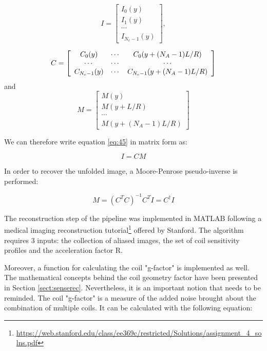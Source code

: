 \begin{equation}
    I = \left[
    \begin{array}{ c }
          I_0(y) \\
          I_1(y) \\
          \cdots \\
           I_{N_c-1}(y)
    \end{array}
    \right],
\end{equation}

\begin{equation}
    C = \left[
    \begin{array}{ c c c }
          C_0(y) & \cdots & C_0(y+(N_A-1)L/R)  \\
          \cdots & \cdots & \cdots \\
          C_{N_c-1}(y) & \cdots & C_{N_c-1}(y+(N_A-1)L/R)
    \end{array}
    \right]
\end{equation}
and
\begin{equation}
    M = \left[
    \begin{array}{ c }
          M(y) \\
          M(y+L/R) \\
          \cdots \\
          M(y+(N_A-1)L/R)
    \end{array}
    \right]
\end{equation}

We can therefore write equation \ref{eq:45} in matrix form as:

\begin{equation}
    I = C M
\end{equation} 

In order to recover the unfolded image, a Moore-Penrose pseudo-inverse is performed:

\begin{equation}
    M = (C^T C) ^{-1} C^T I =  C^\dagger I
\end{equation}

The reconstruction step of the pipeline was implemented in MATLAB following a medical imaging reconstruction tutorial\footnote{\url{https://web.stanford.edu/class/ee369c/restricted/Solutions/assignment_4_solns.pdf}} offered by Stanford. The algorithm requires 3 inputs: the collection of aliased images, the set of coil sensitivity profiles and the acceleration factor R.

Moreover, a function for calculating the coil "g-factor" is implemented as well. The mathematical concepts behind the coil geometry factor have been presented in Section \ref{sect:senserec}. Nevertheless, it is an important notion that needs to be reminded. The coil "g-factor" is a measure of the added noise brought about the combination of multiple coils. It can be calculated with the following equation:

